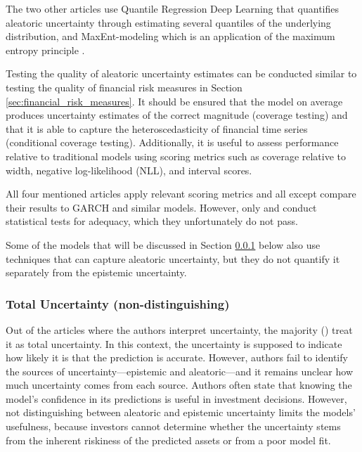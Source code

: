 The two other articles use Quantile Regression Deep Learning \parencite{Wang2024GoldForecasting} that quantifies aleatoric uncertainty through estimating several quantiles of the underlying distribution, and MaxEnt-modeling which is an application of the maximum entropy principle \parencite{Horenko2020}.

Testing the quality of aleatoric uncertainty estimates can be conducted similar to testing the quality of financial risk measures in Section \ref{sec:financial_risk_measures}. It should be ensured that the model on average produces uncertainty estimates of the correct magnitude (coverage testing) and that it is able to capture the heteroscedasticity of financial time series (conditional coverage testing). Additionally, it is useful to assess performance relative to traditional models using scoring metrics such as coverage relative to width, negative log-likelihood (NLL), and interval scores.

All four mentioned articles apply relevant scoring metrics and all except \textcite{Wang2024GoldForecasting} compare their results to GARCH and similar models. However, only \textcite{arian2022encoded} and \textcite{Horenko2020} conduct statistical tests for adequacy, which they unfortunately do not pass.

Some of the models that will be discussed in Section \ref{sec:total_uncertainty} below also use techniques that can capture aleatoric uncertainty, but they do not quantify it separately from the epistemic uncertainty.


\subsubsection{Total Uncertainty (non-distinguishing)}
\label{sec:total_uncertainty}

Out of the \uqanyinterpretation articles where the authors interpret uncertainty, the majority (\uqnondisting) treat it as total uncertainty. In this context, the uncertainty is supposed to indicate how likely it is that the prediction is accurate. However, authors fail to identify the sources of uncertainty—epistemic and aleatoric—and it remains unclear how much uncertainty comes from each source. Authors often state that knowing the model's confidence in its predictions is useful in investment decisions. However, not distinguishing between aleatoric and epistemic uncertainty limits the models' usefulness, because investors cannot determine whether the uncertainty stems from the inherent riskiness of the predicted assets or from a poor model fit.

